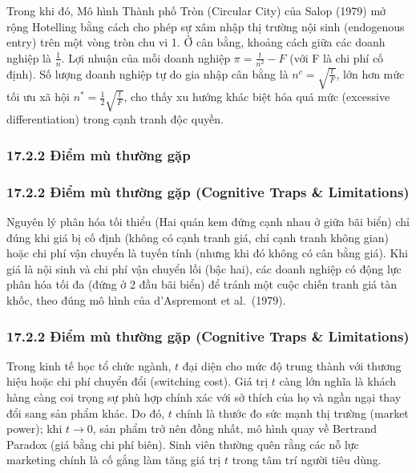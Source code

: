 \documentclass[
]{article}
\begin{document}
Trong khi đó, Mô hình Thành phố Tròn (Circular City) của Salop (1979) mở
rộng Hotelling bằng cách cho phép sự xâm nhập thị trường nội sinh
(endogenous entry) trên một vòng tròn chu vi 1. Ở cân bằng, khoảng cách
giữa các doanh nghiệp là \(\frac{1}{n}\). Lợi nhuận của mỗi doanh nghiệp
\(\pi = \frac{t}{n^2} - F\) (với F là chi phí cố định). Số lượng doanh
nghiệp tự do gia nhập cân bằng là \(n^c = \sqrt{\frac{t}{F}}\), lớn hơn
mức tối ưu xã hội \(n^* = \frac{1}{2}\sqrt{\frac{t}{F}}\), cho thấy xu
hướng khác biệt hóa quá mức (excessive differentiation) trong cạnh tranh
độc quyền.

\subsubsection{17.2.2 Điểm mù thường
gặp}\label{ux111iux1ec3m-muxf9-thux1b0ux1eddng-gux1eb7p-14}

\subsubsection{17.2.2 Điểm mù thường gặp (Cognitive Traps \&
Limitations)}\label{ux111iux1ec3m-muxf9-thux1b0ux1eddng-gux1eb7p-cognitive-traps-limitations-119}

Nguyên lý phân hóa tối thiểu (Hai quán kem đứng cạnh nhau ở giữa bãi
biển) chỉ đúng khi giá bị cố định (không có cạnh tranh giá, chỉ cạnh
tranh không gian) hoặc chi phí vận chuyển là tuyến tính (nhưng khi đó
không có cân bằng giá). Khi giá là nội sinh và chi phí vận chuyển lồi
(bậc hai), các doanh nghiệp có động lực phân hóa tối đa (đứng ở 2 đầu
bãi biển) để tránh một cuộc chiến tranh giá tàn khốc, theo đúng mô hình
của d'Aspremont et al.~(1979).

\subsubsection{17.2.2 Điểm mù thường gặp (Cognitive Traps \&
Limitations)}\label{ux111iux1ec3m-muxf9-thux1b0ux1eddng-gux1eb7p-cognitive-traps-limitations-120}

Trong kinh tế học tổ chức ngành, \(t\) đại diện cho mức độ trung thành
với thương hiệu hoặc chi phí chuyển đổi (switching cost). Giá trị \(t\)
càng lớn nghĩa là khách hàng càng coi trọng sự phù hợp chính xác với sở
thích của họ và ngần ngại thay đổi sang sản phẩm khác. Do đó, \(t\)
chính là thước đo sức mạnh thị trường (market power); khi \(t \to 0\),
sản phẩm trở nên đồng nhất, mô hình quay về Bertrand Paradox (giá bằng
chi phí biên). Sinh viên thường quên rằng các nỗ lực marketing chính là
cố gắng làm tăng giá trị \(t\) trong tâm trí người tiêu dùng.
\end{document}
